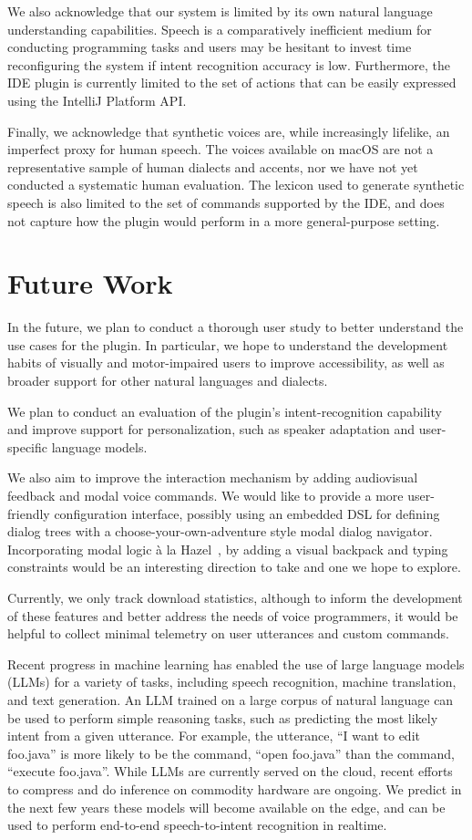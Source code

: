 \documentclass[conference]{IEEEtran}
\begin{document}
We also acknowledge that our system is limited by its own natural language understanding capabilities. Speech is a comparatively inefficient medium for conducting programming tasks and users may be hesitant to invest time reconfiguring the system if intent recognition accuracy is low. Furthermore, the IDE plugin is currently limited to the set of actions that can be easily expressed using the IntelliJ Platform API.

Finally, we acknowledge that synthetic voices are, while increasingly lifelike, an imperfect proxy for human speech. The voices available on macOS are not a representative sample of human dialects and accents, nor we have not yet conducted a systematic human evaluation. The lexicon used to generate synthetic speech is also limited to the set of commands supported by the IDE, and does not capture how the plugin would perform in a more general-purpose setting.

\section{Future Work}

In the future, we plan to conduct a thorough user study to better understand the use cases for the plugin. In particular, we hope to understand the development habits of visually and motor-impaired users to improve accessibility, as well as broader support for other natural languages and dialects.

We plan to conduct an evaluation of the plugin's intent-recognition capability and improve support for personalization, such as speaker adaptation and user-specific language models.

We also aim to improve the interaction mechanism by adding audiovisual feedback and modal voice commands. We would like to provide a more user-friendly configuration interface, possibly using an embedded DSL for defining dialog trees with a choose-your-own-adventure style modal dialog navigator. Incorporating modal logic \`a la Hazel~\cite{omar2021filling}, by adding a visual backpack and typing constraints would be an interesting direction to take and one we hope to explore.

Currently, we only track download statistics, although to inform the development of these features and better address the needs of voice programmers, it would be helpful to collect minimal telemetry on user utterances and custom commands.

Recent progress in machine learning has enabled the use of large language models (LLMs) for a variety of tasks, including speech recognition, machine translation, and text generation. An LLM trained on a large corpus of natural language can be used to perform simple reasoning tasks, such as predicting the most likely intent from a given utterance. For example, the utterance, ``I want to edit foo.java'' is more likely to be the command, ``open foo.java'' than the command, ``execute foo.java''. While LLMs are currently served on the cloud, recent efforts to compress and do inference on commodity hardware are ongoing. We predict in the next few years these models will become available on the edge, and can be used to perform end-to-end speech-to-intent recognition in realtime.
\end{document}
